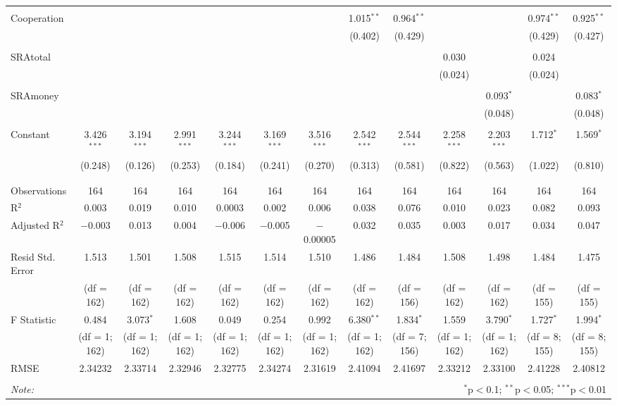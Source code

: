 \begin{table}[H]
\begin{adjustbox}{width=\textwidth}
\begin{tabular}{@{\extracolsep{5pt}}lcccccccccccc}
  & & & & & & & & & & & & \\ 
 Cooperation &  &  &  &  &  &  & 1.015$^{**}$ & 0.964$^{**}$ &  &  & 0.974$^{**}$ & 0.925$^{**}$ \\ 
  &  &  &  &  &  &  & (0.402) & (0.429) &  &  & (0.429) & (0.427) \\ 
  & & & & & & & & & & & & \\ 
 SRAtotal &  &  &  &  &  &  &  &  & 0.030 &  & 0.024 &  \\ 
  &  &  &  &  &  &  &  &  & (0.024) &  & (0.024) &  \\ 
  & & & & & & & & & & & & \\ 
 SRAmoney &  &  &  &  &  &  &  &  &  & 0.093$^{*}$ &  & 0.083$^{*}$ \\ 
  &  &  &  &  &  &  &  &  &  & (0.048) &  & (0.048) \\ 
  & & & & & & & & & & & & \\ 
 Constant & 3.426$^{***}$ & 3.194$^{***}$ & 2.991$^{***}$ & 3.244$^{***}$ & 3.169$^{***}$ & 3.516$^{***}$ & 2.542$^{***}$ & 2.544$^{***}$ & 2.258$^{***}$ & 2.203$^{***}$ & 1.712$^{*}$ & 1.569$^{*}$ \\ 
  & (0.248) & (0.126) & (0.253) & (0.184) & (0.241) & (0.270) & (0.313) & (0.581) & (0.822) & (0.563) & (1.022) & (0.810) \\ 
  & & & & & & & & & & & & \\ 
\hline \\[-1.8ex] 
Observations & 164 & 164 & 164 & 164 & 164 & 164 & 164 & 164 & 164 & 164 & 164 & 164 \\ 
R$^{2}$ & 0.003 & 0.019 & 0.010 & 0.0003 & 0.002 & 0.006 & 0.038 & 0.076 & 0.010 & 0.023 & 0.082 & 0.093 \\ 
Adjusted R$^{2}$ & $-$0.003 & 0.013 & 0.004 & $-$0.006 & $-$0.005 & $-$0.00005 & 0.032 & 0.035 & 0.003 & 0.017 & 0.034 & 0.047 \\ 
Resid Std. Error & 1.513 & 1.501 & 1.508 & 1.515  & 1.514 & 1.510 & 1.486  & 1.484 & 1.508 & 1.498 & 1.484  & 1.475\\ 
& (df = 162) & (df = 162) & (df = 162) & (df = 162) & (df = 162) & (df = 162) & (df = 162) & (df = 156) & (df = 162) & (df = 162) & (df = 155) & (df = 155) \\
F Statistic & 0.484  & 3.073$^{*}$  & 1.608  & 0.049  & 0.254 & 0.992  & 6.380$^{**}$  & 1.834$^{*}$  & 1.559  & 3.790$^{*}$ & 1.727$^{*}$  & 1.994$^{*}$  \\ 
& (df = 1; 162) & (df = 1; 162) & (df = 1; 162) & (df = 1; 162) & (df = 1; 162) & (df = 1; 162) & (df = 1; 162) & (df = 7; 156) & (df = 1; 162) & (df = 1; 162)  & (df = 8; 155) & (df = 8; 155) \\
RMSE & 2.34232 & 2.33714 & 2.32946  & 2.32775 & 2.34274 & 2.31619 & 2.41094 & 2.41697 & 2.33212 & 2.33100 & 2.41228 & 2.40812 \\
\hline 
\hline \\[-1.8ex] 
\textit{Note:}  & \multicolumn{12}{r}{$^{*}$p$<$0.1; $^{**}$p$<$0.05; $^{***}$p$<$0.01} \\ 
\end{tabular} 
\end{adjustbox}
\end{table} 

